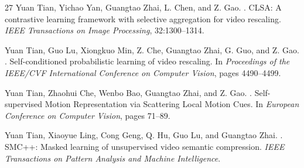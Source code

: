 \documentclass[10pt,twocolumn]{article}
\begin{document}
\begin{thebibliography}{27}
Yuan Tian, Yichao Yan, Guangtao Zhai, L. Chen, and Z. Gao.
.
\newblock CLSA: A contrastive learning framework with selective aggregation for video rescaling.
\newblock \emph{IEEE Transactions on Image Processing}, 32:1300--1314.

Yuan Tian, Guo Lu, Xiongkuo Min, Z. Che, Guangtao Zhai, G. Guo, and Z. Gao.
.
\newblock Self-conditioned probabilistic learning of video rescaling.
\newblock In \emph{Proceedings of the IEEE/CVF International Conference on Computer Vision}, pages 4490--4499.

Yuan Tian, Zhaohui Che, Wenbo Bao, Guangtao Zhai, and Z. Gao.
.
\newblock Self-supervised Motion Representation via Scattering Local Motion Cues.
\newblock In \emph{European Conference on Computer Vision}, pages 71--89.

Yuan Tian, Xiaoyue Ling, Cong Geng, Q. Hu, Guo Lu, and Guangtao Zhai.
.
\newblock SMC++: Masked learning of unsupervised video semantic compression.
\newblock \emph{IEEE Transactions on Pattern Analysis and Machine Intelligence}.

\end{thebibliography}
\end{document}
